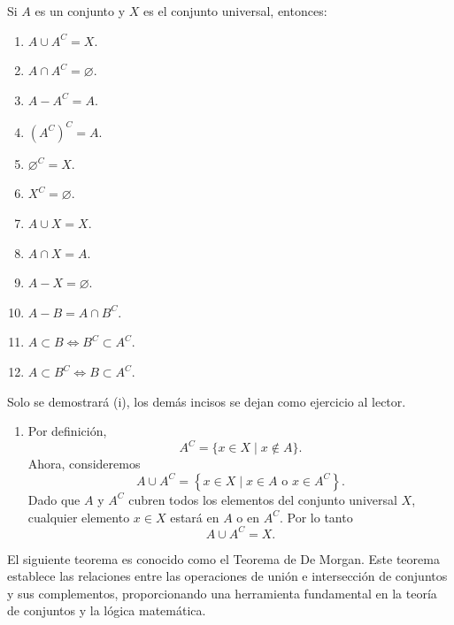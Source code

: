 \begin{prop}{}{}
    Si $A$ es un conjunto y $X$ es el conjunto universal, entonces:
    \begin{enumerate}[label=\roman*., topsep=6pt, itemsep=0pt]
        \item $A \cup A^C = X$.
        \item $A \cap A^C = \varnothing$.
        \item $A - A^C = A$.
        \item $\left(A^C\right)^C = A$.
        \item $\varnothing^C = X$.
        \item $X^C = \varnothing$.
        \item $A \cup X = X$.
        \item $A \cap X = A$.
        \item $A - X = \varnothing$.
        \item $A - B = A \cap B^C$.
        \item $A \subset B \Longleftrightarrow B^C \subset A^C$.
        \item $A \subset B^C \Longleftrightarrow B \subset A^C$.
    \end{enumerate}
    \tcblower
    \demostracion Solo se demostrará (i), los demás incisos se dejan como ejercicio al lector.
    \begin{enumerate}[label=\roman*., topsep=6pt, itemsep=0pt]
        \item Por definición,
        $$A^C = \{x \in X \mid x \notin A\}.$$
        Ahora, consideremos
        $$A \cup A^C = \left\{x \in X \mid x \in A \text{ o } x \in A^C\right\}.$$
        Dado que $A$ y $A^C$ cubren todos los elementos del conjunto universal $X$, cualquier elemento $x \in X$ estará en $A$ o en $A^C$. Por lo tanto
        $$A \cup A^C = X.$$
    \end{enumerate}
\end{prop}

\newpage

El siguiente teorema es conocido como el Teorema de De Morgan. Este teorema establece las relaciones entre las operaciones de unión e intersección de conjuntos y sus complementos, proporcionando una herramienta fundamental en la teoría de conjuntos y la lógica matemática.

